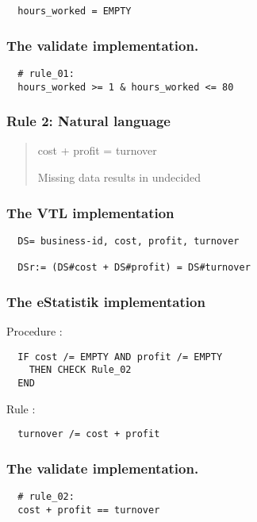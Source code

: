 \begin{verbatim}
  hours_worked = EMPTY
\end{verbatim}

\subsubsection*{The validate implementation.}
\begin{verbatim}
  # rule_01:
  hours_worked >= 1 & hours_worked <= 80
\end{verbatim}


\newpage

\subsubsection*{  Rule 2: Natural language}
\begin{quote}


cost + profit = turnover

Missing data results in undecided



\end{quote}

\subsubsection*{The VTL implementation}
\begin{verbatim}
  DS= business-id, cost, profit, turnover

  DSr:= (DS#cost + DS#profit) = DS#turnover
\end{verbatim}

\subsubsection*{The eStatistik implementation}
\noindent
Procedure :
\begin{verbatim}
  IF cost /= EMPTY AND profit /= EMPTY 
    THEN CHECK Rule_02
  END
\end{verbatim}
Rule :
\begin{verbatim}
  turnover /= cost + profit
\end{verbatim}

\subsubsection*{The validate implementation.}
\begin{verbatim}
  # rule_02:
  cost + profit == turnover
\end{verbatim}


